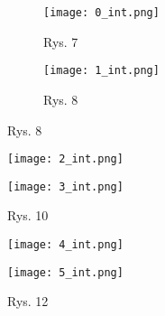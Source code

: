 \begin{figure}[!h]
    \centering
    \begin{subfigure}{.5\textwidth}
      \centering
      \texttt{[image: 0\_int.png]}
      \caption*{Rys. 7}
      \label{fig:sub1}
    \end{subfigure}%
    \begin{subfigure}{.5\textwidth}
      \centering
      \texttt{[image: 1\_int.png]}
      \caption*{Rys. 8}
      \label{fig:sub2}
    \end{subfigure}
    \label{fig:test}
    \end{figure}

    \begin{figure}[!ht]
    \centering
    \begin{minipage}{.5\textwidth}
      \centering
      \texttt{[image: 2\_int.png]}
      \caption*{Rys. 9}
      \label{fig:test1}
    \end{minipage}%
    \begin{minipage}{.5\textwidth}
      \centering
      \texttt{[image: 3\_int.png]}
      \caption*{Rys. 10}
      \label{fig:test2}
    \end{minipage}
    \end{figure}
    \begin{figure}[!ht]
        \centering
        \begin{minipage}{.5\textwidth}
          \centering
          \texttt{[image: 4\_int.png]}
          \caption*{Rys. 11}
          \label{fig:test1}
        \end{minipage}%
        \begin{minipage}{.5\textwidth}
          \centering
          \texttt{[image: 5\_int.png]}
          \caption*{Rys. 12}
          \label{fig:test2}
        \end{minipage}
        \end{figure}